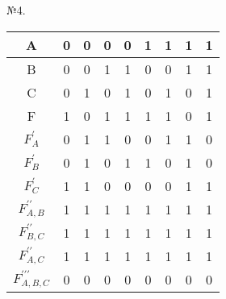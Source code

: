 \documentclass[a4paper,10pt]{report} %
\begin{document}
\begin{multicols}{2}



\bigskip
\centering
№4.\\
\bigskip
\begin{tabular}{|c|c|c|c|c|c|c|c|c|}
\hline
A &0 &0 &0 &0 &1 &1 &1 &1 \\
\hline
B &0 &0 &1 &1 &0 &0 &1 &1 \\
\hline
C &0 &1 &0 &1 &0 &1 &0 &1 \\
\hline
F  &1 & 0 & 1 & 1 & 1 & 1 & 0 & 1 \\
\hline
$F_A^{\prime}$ &0&1&1&0&0&1&1&0\\
\hline
$F_B^{\prime}$ &0&1&0&1&1&0&1&0\\
\hline
$F_C^{\prime}$ &1&1&0&0&0&0&1&1\\
\hline
$F_{A,B}^{\prime\prime}$ &1&1&1&1&1&1&1&1\\
\hline
$F_{B,C}^{\prime\prime}$ &1&1&1&1&1&1&1&1\\
\hline
$F_{A,C}^{\prime\prime}$ &1&1&1&1&1&1&1&1\\
\hline
$F_{A,B,C}^{\prime\prime\prime}$ &0&0&0&0&0&0&0&0\\

\hline
\end{tabular}\\
\bigskip


\end{multicols}
\end{document}
